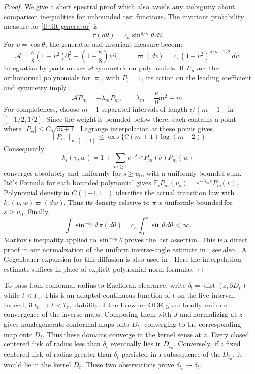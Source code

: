 \documentclass[11pt]{article}
\theoremstyle{definition}
\theoremstyle{remark}
\numberwithin{equation}{section}
\begin{document}
\begin{proof}
We give a short spectral proof which also avoids any ambiguity about
comparison inequalities for unbounded test functions. The invariant
probability measure for \eqref{ll:tilt-generator} is
\[
 \pi(d\theta)=c_\kappa\sin^{8/\kappa}\theta\,d\theta.
\]
For $v=\cos\theta$, the generator and invariant measure become
\[
 \mathcal A=\frac\kappa8(1-v^2)\partial_v^2
                   -\left(1+\frac\kappa8\right)v\partial_v,
 \qquad
 \varpi(dv)=\widetilde c_\kappa
                     (1-v^2)^{4/\kappa-1/2}\,dv.
\]
Integration by parts makes $\mathcal A$ symmetric on polynomials.
If $P_m$ are the orthonormal polynomials for $\varpi$, with $P_0=1$,
its action on the leading coefficient and symmetry imply
\[
 \mathcal AP_m=-\lambda_mP_m,
 \qquad \lambda_m=\frac\kappa8m^2+m.
\]
For completeness, choose $m+1$ separated intervals of length
$c/(m+1)$ in $[-1/2,1/2]$. Since the weight is bounded below there,
each contains a point where $|P_m|\le C\sqrt{m+1}$.
Lagrange interpolation at these points gives
\[
 \|P_m\|_{\infty,[-1,1]}
          \le \exp\{C(m+1)\log(m+2)\}.
\]
Consequently
\[
 k_s(v,w)=1+\sum_{m\ge1}e^{-\lambda_ms}P_m(v)P_m(w)
\]
converges absolutely and uniformly for $s\ge u_0$, with a uniformly
bounded sum. It\^o's Formula for each bounded polynomial gives
$\mathbb E_vP_m(v_s)=e^{-\lambda_ms}P_m(v)$.
Polynomial density in $C([-1,1])$ identifies the actual transition
law with $k_s(v,w)\varpi(dw)$. Thus its density relative to $\pi$
is uniformly bounded for $s\ge u_0$. Finally,
\[
 \int\sin^{-a_0}\theta\,\pi(d\theta)
      =c_\kappa\int_0^\pi\sin\theta\,d\theta<\infty.
\]
Markov's inequality applied to $\sin^{-a_0}\theta$ proves the last
assertion.  This is a direct proof in our normalization of the uniform
inverse-angle estimate in \cite[Lemma~2.9]{lawlerwerness2013}; see also
\cite[Lemma~2.2]{lawlerzhou2013}.
A Gegenbauer expansion for this diffusion is also used in
\cite[Proposition~4.2]{zhan2019optimal}. Here the interpolation estimate
suffices in place of explicit polynomial norm formulas.
\end{proof}

To pass from conformal radius to Euclidean clearance, write
$\delta_t=\operatorname{dist}(z,\partial D_t)$ while $t<T_z$.
This is an adapted continuous function of $t$ on the live interval.
Indeed, if $t_n\to t<T_z$, stability of the Loewner ODE gives locally
uniform convergence of the inverse maps.  Composing them with $J$ and
normalizing at $z$ gives nondegenerate conformal maps onto $D_{t_n}$
converging to the corresponding map onto $D_t$.  Thus these domains
converge in the kernel sense at $z$.  Every closed centered disk of
radius less than $\delta_t$ eventually lies in $D_{t_n}$.  Conversely,
if a fixed centered disk of radius greater than $\delta_t$ persisted
in a subsequence of the $D_{t_n}$, it would lie in the kernel $D_t$.
These two observations prove $\delta_{t_n}\to\delta_t$.
\end{document}

